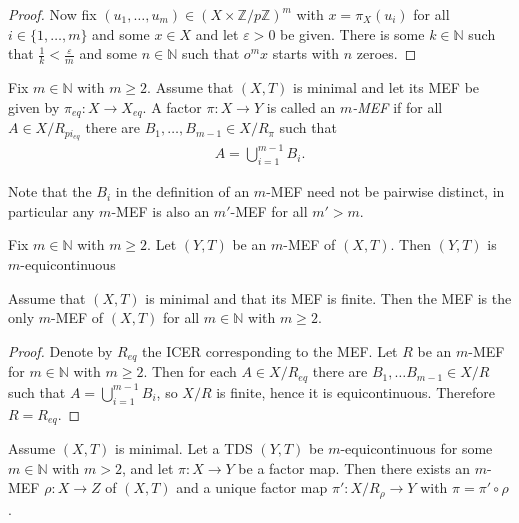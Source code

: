 \begin{proof}
	Now fix $(u_1, \dots, u_m) \in (X \times \mathbb{Z}/p\mathbb{Z})^m$ with $x = \pi_X(u_i)$ for all $i \in \{1, \dots, m\}$ and some $x \in X$ and let $\varepsilon > 0$ be given. There is some $k \in \mathbb{N}$ such that $\frac{1}{k} < \frac{\varepsilon}{m}$ and some $n \in \mathbb{N}$ such that $o^m x$ starts with $n$ zeroes.
\end{proof}

\begin{definition}[$m$-MEF]
	Fix $m \in \mathbb{N}$ with $m \geq 2$. Assume that $(X, T)$ is minimal and let its MEF be given by $\pi_{eq}: X \to X_{eq}$. A factor $\pi: X \to Y$ is called an \emph{$m$-MEF} if for all $A \in X/R_{pi_{eq}}$ there are $B_1, \dots, B_{m-1} \in X/R_\pi$ such that
	\begin{align*}
		A = \bigcup_{i=1}^{m-1} B_i.
	\end{align*}
\end{definition}

\begin{remark}
	Note that the $B_i$ in the definition of an $m$-MEF need not be pairwise distinct, in particular any $m$-MEF is also an $m'$-MEF for all $m' > m$.
\end{remark}

\begin{proposition}
	Fix $m \in \mathbb{N}$ with $m \geq 2$. Let $(Y, T)$ be an $m$-MEF of $(X, T)$. Then $(Y, T)$ is $m$-equicontinuous
\end{proposition}

\begin{proposition}
	Assume that $(X, T)$ is minimal and that its MEF is finite. Then the MEF is the only $m$-MEF of $(X, T)$ for all $m \in \mathbb{N}$ with $m \geq 2$.
\end{proposition}
\begin{proof}
	Denote by $R_{eq}$ the ICER corresponding to the MEF. Let $R$ be an $m$-MEF for $m \in \mathbb{N}$ with $m \geq 2$. Then for each $A \in X/R_{eq}$ there are $B_1, \dots B_{m-1} \in X/R$ such that $A = \bigcup_{i=1}^{m-1} B_i$, so $X/R$ is finite, hence it is equicontinuous. Therefore $R = R_{eq}$.
\end{proof}

\begin{theorem}
	Assume $(X, T)$ is minimal. Let a TDS $(Y, T)$ be $m$-equicontinuous for some $m \in \mathbb{N}$ with $m > 2$, and let $\pi: X \to Y$ be a factor map. Then there exists an $m$-MEF $\rho: X \to Z$ of $(X, T)$ and a unique factor map $\pi': X/R_\rho \to Y$ with $\pi = \pi' \circ \rho$.
\end{theorem}

